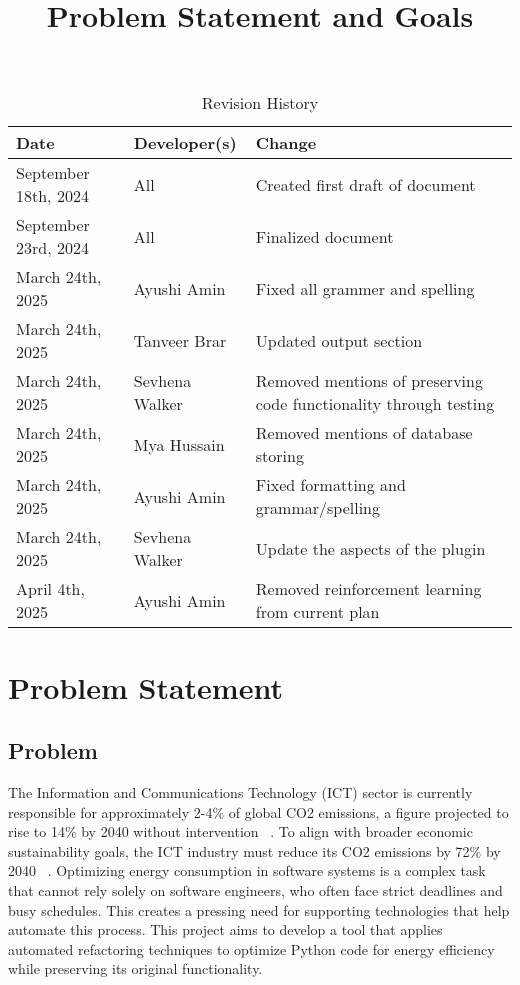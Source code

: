 \documentclass{article}
\title{Problem Statement and Goals\\\progname}
\author{\authname}
\date{}
\begin{document}
\maketitle

\begin{table}[hp]
  \caption{Revision History} \label{TblRevisionHistory}
  \begin{tabularx}{\textwidth}{llX}
    \toprule
    \textbf{Date} & \textbf{Developer(s)} & \textbf{Change}\\
    \midrule
    September 18th, 2024 & All & Created first draft of document\\
    September 23rd, 2024 & All & Finalized document\\
    March 24th, 2025 & Ayushi Amin & Fixed all grammer and spelling \\
    March 24th, 2025 & Tanveer Brar & Updated output section \\
    March 24th, 2025 & Sevhena Walker & Removed mentions of preserving code functionality through testing \\
    March 24th, 2025 & Mya Hussain & Removed mentions of database storing \\
    March 24th, 2025 & Ayushi Amin & Fixed formatting and grammar/spelling \\
    March 24th, 2025 & Sevhena Walker & Update the aspects of the plugin \\
    April 4th, 2025 & Ayushi Amin & Removed reinforcement learning from current plan \\
    \bottomrule
  \end{tabularx}
\end{table}

\newpage

\section{Problem Statement}

\subsection{Problem}

The Information and Communications Technology (ICT) sector is currently 
responsible for approximately 2-4\% of global CO2 emissions, a figure 
projected to rise to 14\% by 2040 without intervention ~\citep{BelkhirAndElmeligi2018}. 
To align with broader economic sustainability goals, 
the ICT industry must reduce its CO2 emissions by 72\% by 
2040 ~\citep{FreitagAndBernersLee2021}. Optimizing energy 
consumption in software systems is a complex task that cannot 
rely solely on software engineers, who often face strict deadlines 
and busy schedules. This creates a pressing need for supporting 
technologies that help automate this process. This project aims 
to develop a tool that applies automated refactoring techniques 
to optimize Python code for energy efficiency while preserving its 
original functionality. 
\end{document}
